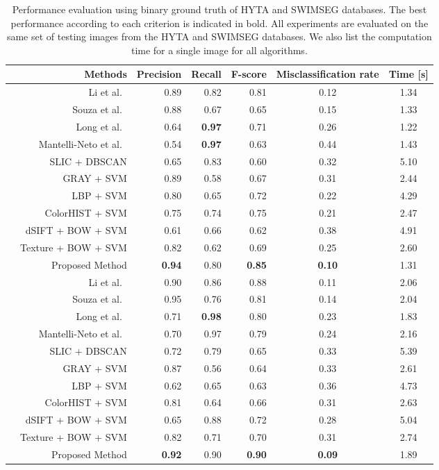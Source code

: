 \begin{table}[htbp]
\footnotesize
\centering
\begin{tabular}{ |lr||r|r|r|c|c| }
\hline
& Methods & Precision & Recall & F-score & Misclassification rate & Time [s] \\ 
\hline\hline
\parbox[t]{3mm}{} 
& Li et al.\ & 0.89 & 0.82 & 0.81 & 0.12 & 1.34 \\ 
& Souza et al.\ & 0.88 &  0.67 &  0.65 & 0.15 & 1.33 \\ 
& Long et al.\ & 0.64 & \textbf{0.97} & 0.71  & 0.26 & 1.22 \\ 
& Mantelli-Neto et al.\ & 0.54 & \textbf{0.97} & 0.63 & 0.44 & 1.43 \\ 
& SLIC + DBSCAN & 0.65 & 0.83 & 0.60 & 0.32 & 5.10 \\ 
& GRAY + SVM & 0.89 & 0.58 & 0.67 & 0.31 & 2.44  \\
& LBP + SVM & 0.80 & 0.65 & 0.72 & 0.22 & 4.29 \\
& ColorHIST + SVM & 0.75 & 0.74 & 0.75 & 0.21 & 2.47  \\
& dSIFT + BOW + SVM & 0.61 & 0.66 & 0.62 & 0.38 & 4.91 \\
& Texture + BOW + SVM & 0.82 & 0.62 & 0.69 & 0.25 & 2.60  \\
& Proposed Method & \textbf{0.94} & 0.80 & \textbf{0.85} & \textbf{0.10} & 1.31  \\ 
\hline\hline
\parbox[t]{3mm}{} 
& Li et al.\ & 0.90 & 0.86 & 0.88 & 0.11 & 2.06  \\ 
& Souza et al.\ & 0.95 &  0.76 &  0.81 & 0.14 & 2.04 \\ 
& Long et al.\ & 0.71 & \textbf{0.98} & 0.80 & 0.23 & 1.83  \\ 
& Mantelli-Neto et al.\ & 0.70 & 0.97 & 0.79 & 0.24 & 2.16 \\ 
& SLIC + DBSCAN & 0.72 & 0.79 & 0.65 & 0.33 & 5.39 \\ 
& GRAY + SVM & 0.87 & 0.56 & 0.64 & 0.33 & 2.61 \\
& LBP + SVM & 0.62 & 0.65 &  0.63 & 0.36 & 4.73 \\
& ColorHIST + SVM & 0.81 & 0.64 & 0.66 & 0.31 & 2.63  \\
& dSIFT + BOW + SVM & 0.65 & 0.88 & 0.72 & 0.28 & 5.04 \\
& Texture + BOW + SVM & 0.82 & 0.71 & 0.70 & 0.31 & 2.74  \\
& Proposed Method  & \textbf{0.92} & 0.90 & \textbf{0.90} & \textbf{0.09} & 1.89 \\ 
\hline
\end{tabular}
\caption[Performance evaluation of different benchmarking algorithms.]{Performance evaluation using binary ground truth of HYTA and SWIMSEG databases. The best performance according to each criterion is indicated in bold. All experiments are evaluated on the same set of testing images from the HYTA and SWIMSEG databases. We also list the computation time for a single image for all algorithms.}
\label{scoretable}
\end{table}


